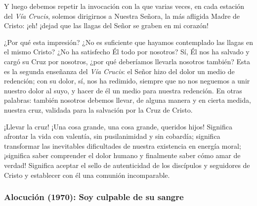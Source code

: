 \begin{body}
Y luego debemos repetir la invocación con la que varias veces, en cada estación del \textit{Vía Crucis}, solemos dirigirnos a Nuestra Señora, la más afligida Madre de Cristo: ¡eh! ¡dejad que las llagas del Señor se graben en mi corazón! 

¿Por qué esta impresión? ¿No es suficiente que hayamos contemplado las llagas en el mismo Cristo? ¿No ha satisfecho Él todo por nosotros? Sí, Él nos ha salvado y cargó su Cruz por nosotros, ¿por qué deberíamos llevarla nosotros también? Esta es la segunda enseñanza del \textit{Vía Crucis}: el Señor hizo del dolor un medio de redención; con su dolor, sí, nos ha redimido, siempre que no nos neguemos a unir nuestro dolor al suyo, y hacer de él un medio para nuestra redención. En otras palabras: también nosotros debemos llevar, de alguna manera y en cierta medida, nuestra cruz, validada para la salvación por la Cruz de Cristo. 

¡Llevar la cruz! ¡Una cosa grande, una cosa grande, queridos hijos! Significa afrontar la vida con valentía, sin pusilanimidad y sin cobardía; significa transformar las inevitables dificultades de nuestra existencia en energía moral; ¡significa saber comprender el dolor humano y finalmente saber cómo amar de verdad! Significa aceptar el sello de autenticidad de los discípulos y seguidores de Cristo y establecer con él una comunión incomparable.
\end{body}

\subsubsection{Alocución (1970): Soy culpable de su sangre}


